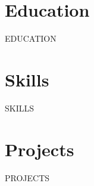 \documentclass[10pt,letterpaper]{article}
\makeatletter
\newcommand{\projentry}[3]{%
  \vspace{0pt}%
  \begin{tabular*}{\textwidth}[t]{l@{\extracolsep{\fill}}r}%
    \textbf{#1}\enspace---\enspace\textit{#2} & #3 \\%
  \end{tabular*}\par\nopagebreak\vspace{-4pt}%
}
\makeatother
\begin{document}
\section{Education}
{{EDUCATION}}

\section{Skills}
{{SKILLS}}

\section{Projects}
{{PROJECTS}}
\end{document}

